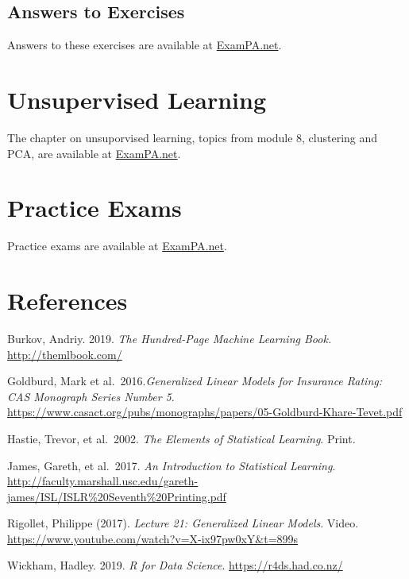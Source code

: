 \documentclass[openany]{book}
\begin{document}
\hypertarget{answers-to-exercises-1}{%
\section{Answers to Exercises}\label{answers-to-exercises-1}}

Answers to these exercises are available at \href{https://www.exampa.net/pricing}{ExamPA.net}.

\hypertarget{unsupervised-learning}{%
\chapter{Unsupervised Learning}\label{unsupervised-learning}}

The chapter on unsuporvised learning, topics from module 8, clustering and PCA, are available at \href{https://www.exampa.net/pricing}{ExamPA.net}.

\hypertarget{practice-exams}{%
\chapter{Practice Exams}\label{practice-exams}}

Practice exams are available at \href{https://www.exampa.net/pricing}{ExamPA.net}.

\hypertarget{references}{%
\chapter{References}\label{references}}

Burkov, Andriy. 2019. \emph{The Hundred-Page Machine Learning Book.} \url{http://themlbook.com/}

Goldburd, Mark et al.~2016.\emph{Generalized Linear Models for Insurance Rating: CAS Monograph Series Number 5}. \url{https://www.casact.org/pubs/monographs/papers/05-Goldburd-Khare-Tevet.pdf}

Hastie, Trevor, et al.~2002. \emph{The Elements of Statistical Learning}. Print.

James, Gareth, et al.~2017. \emph{An Introduction to Statistical Learning}.
\url{http://faculty.marshall.usc.edu/gareth-james/ISL/ISLR\%20Seventh\%20Printing.pdf}

Rigollet, Philippe (2017). \emph{Lecture 21: Generalized Linear Models}. Video. \url{https://www.youtube.com/watch?v=X-ix97pw0xY\&t=899s}

Wickham, Hadley. 2019. \emph{R for Data Science}. \url{https://r4ds.had.co.nz/}


\end{document}
